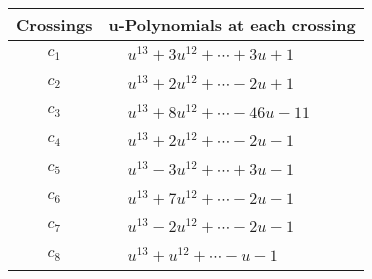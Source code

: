 \documentclass[1p]{elsarticle_modified}
\theoremstyle{definition}
\begin{document}
\begin{tabular}{m{50pt}|m{274pt}}
Crossings & \hspace{64pt}u-Polynomials at each crossing \\
\hline $$\begin{aligned}c_{1}\end{aligned}$$&$\begin{aligned}
&u^{13}+3 u^{12}+\cdots+3 u+1
\end{aligned}$\\
\hline $$\begin{aligned}c_{2}\end{aligned}$$&$\begin{aligned}
&u^{13}+2 u^{12}+\cdots-2 u+1
\end{aligned}$\\
\hline $$\begin{aligned}c_{3}\end{aligned}$$&$\begin{aligned}
&u^{13}+8 u^{12}+\cdots-46 u-11
\end{aligned}$\\
\hline $$\begin{aligned}c_{4}\end{aligned}$$&$\begin{aligned}
&u^{13}+2 u^{12}+\cdots-2 u-1
\end{aligned}$\\
\hline $$\begin{aligned}c_{5}\end{aligned}$$&$\begin{aligned}
&u^{13}-3 u^{12}+\cdots+3 u-1
\end{aligned}$\\
\hline $$\begin{aligned}c_{6}\end{aligned}$$&$\begin{aligned}
&u^{13}+7 u^{12}+\cdots-2 u-1
\end{aligned}$\\
\hline $$\begin{aligned}c_{7}\end{aligned}$$&$\begin{aligned}
&u^{13}-2 u^{12}+\cdots-2 u-1
\end{aligned}$\\
\hline $$\begin{aligned}c_{8}\end{aligned}$$&$\begin{aligned}
&u^{13}+u^{12}+\cdots- u-1
\end{aligned}$\\

\end{tabular}
\end{document}
